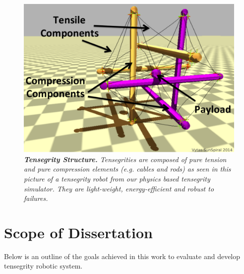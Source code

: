  \begin{figure}[h]
   \centering
   \includegraphics[width=0.5\columnwidth]{tex/img/fig_basic_diagram}
   \caption{{\em {\bf Tensegrity Structure.} Tensegrities are composed of pure tension and pure compression elements (e.g. cables and rods) as seen in this picture of a tensegrity robot from our physics based tensegrity simulator. They are light-weight, energy-efficient and robust to failures.}}
   \label{fig:basic_diagram1}
\end{figure}

\section{Scope of Dissertation}
\label{goal}
Below is an outline of the goals achieved in this work to evaluate and develop tensegrity robotic system. 


